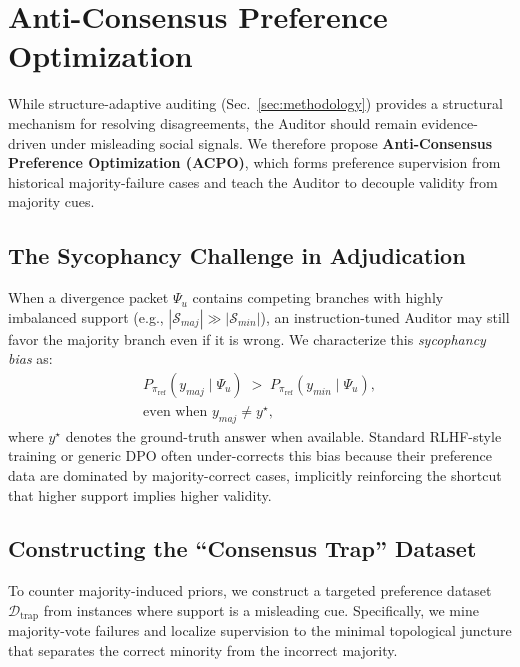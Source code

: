 \documentclass{article}
\theoremstyle{plain}
\theoremstyle{definition}
\theoremstyle{remark}
\begin{document}
\section{Anti-Consensus Preference Optimization}
\label{sec:training}

While structure-adaptive auditing (Sec.~\ref{sec:methodology}) provides a structural mechanism for resolving disagreements, the Auditor should remain evidence-driven under misleading social signals. We therefore propose \textbf{Anti-Consensus Preference Optimization (ACPO)}, which forms preference supervision from historical majority-failure cases and teach the Auditor to decouple validity from majority cues.


\subsection{The Sycophancy Challenge in Adjudication}
When a divergence packet $\Psi_u$ contains competing branches with highly imbalanced support (e.g., $|\mathcal{S}_{maj}| \gg |\mathcal{S}_{min}|$), an instruction-tuned Auditor may still favor the majority branch even if it is wrong. We characterize this \textit{sycophancy bias} as:
\begin{equation}
\begin{aligned}
    P_{\pi_{\mathrm{ref}}}\!\left(y_{maj}\mid \Psi_u\right)
    \;>\;
    P_{\pi_{\mathrm{ref}}}\!\left(y_{min}\mid \Psi_u\right), \\
    \text{even when } y_{maj} \neq y^\star,
\end{aligned}
\end{equation}
where $y^\star$ denotes the ground-truth answer when available. Standard RLHF-style training or generic DPO often under-corrects this bias because their preference data are dominated by majority-correct cases, implicitly reinforcing the shortcut that higher support implies higher validity.

\subsection{Constructing the ``Consensus Trap'' Dataset}
To counter majority-induced priors, we construct a targeted preference dataset $\mathcal{D}_{\mathrm{trap}}$ from instances where support is a misleading cue.
Specifically, we mine majority-vote failures and localize supervision to the minimal topological juncture that separates the correct minority from the incorrect majority.
\end{document}
